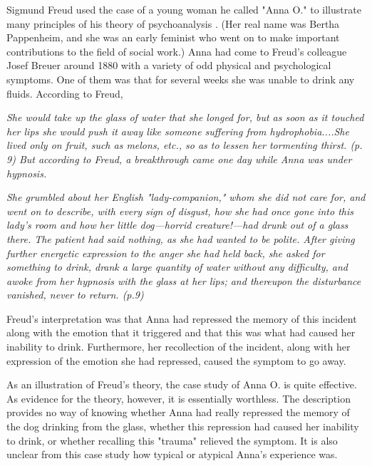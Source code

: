 \color{fgcolor}\begin{kframe}

Sigmund Freud used the case of a young woman he called "Anna O." to illustrate many principles of his theory of psychoanalysis \citep{freud_five_1977}. (Her real name was Bertha Pappenheim, and she was an early feminist who went on to make important contributions to the field of social work.) Anna had come to Freud's colleague Josef Breuer around 1880 with a variety of odd physical and psychological symptoms. One of them was that for several weeks she was unable to drink any fluids. According to Freud,

\emph{She would take up the glass of water that she longed for, but as soon as it touched her lips she would push it away like someone suffering from hydrophobia....She lived only on fruit, such as melons, etc., so as to lessen her tormenting thirst. (p. 9)
But according to Freud, a breakthrough came one day while Anna was under hypnosis.}

\emph{She grumbled about her English "lady-companion," whom she did not care for, and went on to describe, with every sign of disgust, how she had once gone into this lady's room and how her little dog---horrid creature!---had drunk out of a glass there. The patient had said nothing, as she had wanted to be polite. After giving further energetic expression to the anger she had held back, she asked for something to drink, drank a large quantity of water without any difficulty, and awoke from her hypnosis
with the glass at her lips; and thereupon the disturbance vanished, never to return. (p.9)}

Freud's interpretation was that Anna had repressed the memory of this incident along with the emotion that it triggered and that this was what had caused her inability to drink. Furthermore, her recollection of the
incident, along with her expression of the emotion she had repressed, caused the symptom to go away.

As an illustration of Freud's theory, the case study of Anna O. is quite effective. As evidence for the theory, however, it is essentially worthless. The description provides no way of knowing whether Anna had really repressed the memory of the dog drinking from the glass, whether this repression had caused her inability to drink, or whether recalling this "trauma" relieved the symptom. It is also unclear from this case
study how typical or atypical Anna's experience was.
\end{kframe}

